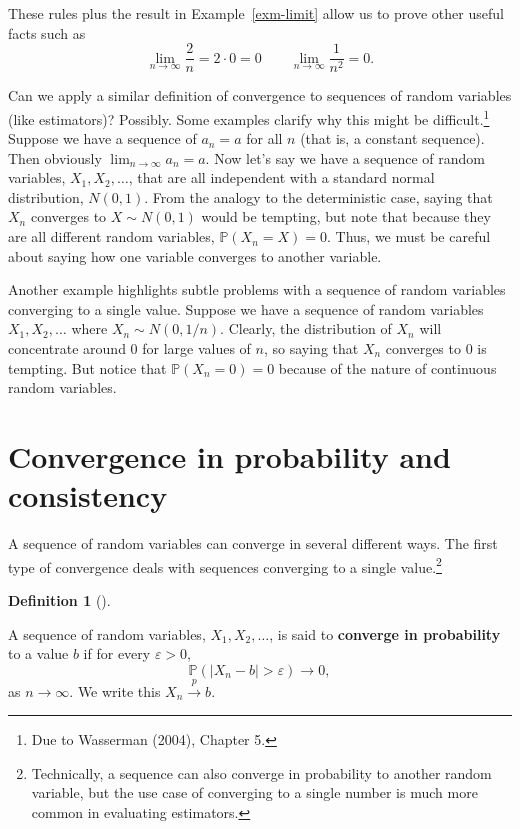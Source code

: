 \documentclass[
  13pt,
  letterpaper,
  DIV=11,
  numbers=noendperiod]{scrreprt}
\renewcommand{\P}{\mathbb{P}}
\newcommand{\inprob}{\overset{p}{\to}}
\theoremstyle{plain}
\theoremstyle{definition}
\theoremstyle{definition}
\newtheorem{definition}{Definition}[chapter]
\theoremstyle{remark}
\begin{document}
These rules plus the result in Example~\ref{exm-limit} allow us to prove
other useful facts such as \[
\lim_{n\to\infty} \frac{2}{n} = 2 \cdot 0 = 0 \qquad  \lim_{n\to\infty} \frac{1}{n^{2}} = 0.
\]

Can we apply a similar definition of convergence to sequences of random
variables (like estimators)? Possibly. Some examples clarify why this
might be difficult.\footnote{Due to Wasserman (2004), Chapter 5.}
Suppose we have a sequence of \(a_n = a\) for all \(n\) (that is, a
constant sequence). Then obviously
\(\lim_{n\rightarrow\infty} a_n = a\). Now let's say we have a sequence
of random variables, \(X_1, X_2, \ldots\), that are all independent with
a standard normal distribution, \(N(0,1)\). From the analogy to the
deterministic case, saying that \(X_n\) converges to \(X \sim N(0, 1)\)
would be tempting, but note that because they are all different random
variables, \(\P(X_n = X) = 0\). Thus, we must be careful about saying
how one variable converges to another variable.

Another example highlights subtle problems with a sequence of random
variables converging to a single value. Suppose we have a sequence of
random variables \(X_1, X_2, \ldots\) where \(X_n \sim N(0, 1/n)\).
Clearly, the distribution of \(X_n\) will concentrate around 0 for large
values of \(n\), so saying that \(X_n\) converges to 0 is tempting. But
notice that \(\P(X_n = 0) = 0\) because of the nature of continuous
random variables.

\section{Convergence in probability and
consistency}\label{convergence-in-probability-and-consistency}

A sequence of random variables can converge in several different ways.
The first type of convergence deals with sequences converging to a
single value.\footnote{Technically, a sequence can also converge in
  probability to another random variable, but the use case of converging
  to a single number is much more common in evaluating estimators.}

\begin{definition}[]\protect\hypertarget{def-inprob}{}\label{def-inprob}

A sequence of random variables, \(X_1, X_2, \ldots\), is said to
\textbf{converge in probability} to a value \(b\) if for every
\(\varepsilon > 0\), \[
\P(|X_n - b| > \varepsilon) \rightarrow 0,
\] as \(n\rightarrow \infty\). We write this \(X_n \inprob b\).

\end{definition}
\end{document}
